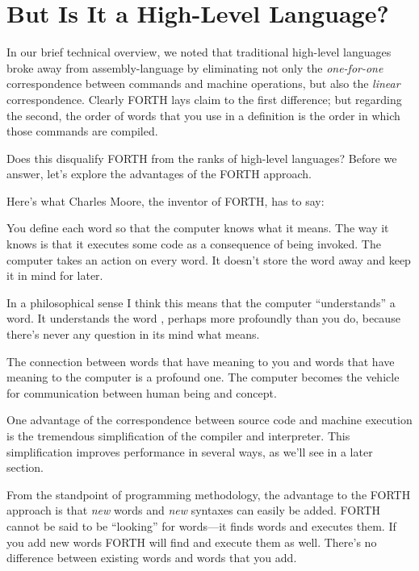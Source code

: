 \section{But Is It a High-Level Language?}
In our brief technical overview, we noted that traditional high-level
languages broke away from assembly-language by eliminating not only
the \emph{one-for-one} correspondence between commands and machine
operations, but also the \emph{linear} correspondence. Clearly FORTH
lays claim to the first difference; but regarding the second, the
order of words that you use in a definition is the order in which
those commands are compiled.

Does this disqualify FORTH from the ranks of high-level languages?
Before we answer, let's explore the advantages of the FORTH approach.


\bigskip\blackline{2ex}
Here's what Charles Moore,
the inventor of FORTH, has to say:

\begin{tfquot}
You define each word so that the computer knows what it means. The way
it knows is that it executes some code as a consequence of being
invoked. The computer takes an action on every word. It doesn't store
the word away and keep it in mind for later.

In a philosophical sense I think this means that the computer
``understands'' a word. It understands the word , perhaps
more profoundly than you do, because there's never any question in its
mind what  means.

The connection between words that have meaning to you and words that
have meaning to the computer is a profound one. The computer becomes
the vehicle for communication between human being and concept.
\end{tfquot} \blackline{1ex}
One advantage of the correspondence between source code and machine
execution is the tremendous simplification of the compiler and
interpreter.  This simplification improves performance in several
ways, as we'll see in a later section.

From the standpoint of programming methodology, the advantage to the
FORTH approach is that \emph{new} words and \emph{new} syntaxes can
easily be added. FORTH cannot be said to be ``looking'' for words---it
finds words and executes them. If you add new words FORTH will find
and execute them as well. There's no difference between existing words
and words that you add.

